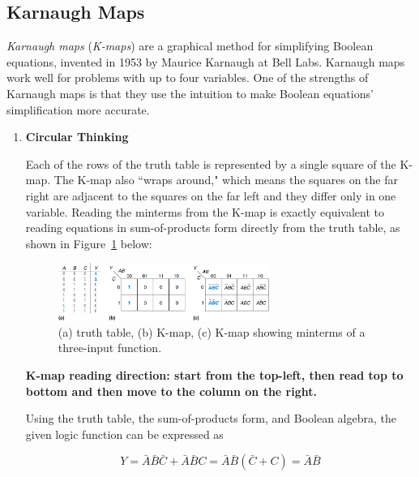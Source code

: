 \documentclass[12pt]{article}
\begin{document}
\subsection{Karnaugh Maps}

\textit{Karnaugh maps} (\textit{K-maps}) are a graphical method for simplifying Boolean equations, invented in 1953 by Maurice Karnaugh at Bell Labs. Karnaugh maps work well for problems with up to four variables. One of the strengths of Karnaugh maps is that they use the intuition to make Boolean equations' simplification more accurate.

\begin{enumerate}
  \item \textbf{Circular Thinking}

  Each of the rows of the truth table is represented by a single square of the K-map. The K-map also ``wraps around," which means the squares on the far right are adjacent to the squares on the far left and they differ only in one variable. Reading the minterms from the K-map is exactly equivalent to reading equations in sum-of-products form directly from the truth table, as shown in Figure~\ref{figure:5} below:

  \begin{figure}
    \centering
    \includegraphics[width=0.65\textwidth]{truth_table_karnaugh_map.png}
    \caption{(a) truth table, (b) K-map, (c) K-map showing minterms of a three-input function.}
    \label{figure:5}
  \end{figure}

  \textbf{K-map reading direction: start from the top-left, then read top to bottom and then move to the column on the right.}

  Using the truth table, the sum-of-products form, and Boolean algebra, the given logic function can be expressed as

  \begin{equation} \label{equation:7}
    Y = \bar{A}\bar{B}\bar{C} + \bar{A}\bar{B}C = \bar{A}\bar{B}(\bar{C} + C) = \bar{A}\bar{B}
  \end{equation}


\end{enumerate}
\end{document}
